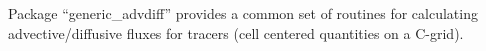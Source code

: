 
Package ``generic\_advdiff'' provides a common set of routines for
calculating advective/diffusive fluxes for tracers (cell centered
quantities on a C-grid).
